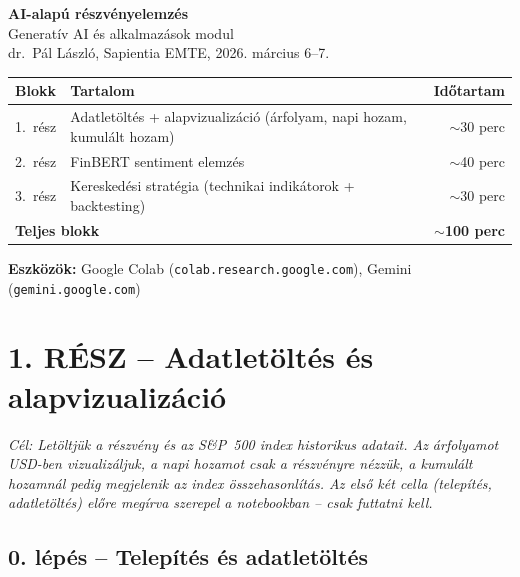 \documentclass[11pt,a4paper]{article}
\begin{document}
\thispagestyle{empty}
\begin{center}
  {\LARGE\bfseries AI-alapú részvényelemzés}\\[5pt]
  {\normalsize Generatív AI és alkalmazások modul}\\[1pt]
  {\small\color{medgray} dr.\ Pál László, Sapientia EMTE, 2026. március 6--7.}
\end{center}

\vspace{10pt}
\noindent
\begin{tabularx}{\linewidth}{lXr}
\toprule
\textbf{Blokk} & \textbf{Tartalom} & \textbf{Időtartam} \\
\midrule
1.\ rész & Adatletöltés + alapvizualizáció (árfolyam, napi hozam, kumulált hozam) & $\sim$30 perc \\
2.\ rész & FinBERT sentiment elemzés & $\sim$40 perc \\
3.\ rész & Kereskedési stratégia (technikai indikátorok + backtesting) & $\sim$30 perc \\
\midrule
\multicolumn{2}{l}{\textbf{Teljes blokk}} & \textbf{$\sim$100 perc} \\
\bottomrule
\end{tabularx}

\smallskip
\noindent\textbf{Eszközök:} Google Colab (\texttt{colab.research.google.com}),
Gemini (\texttt{gemini.google.com})

\vspace{8pt}

\section{1. RÉSZ -- Adatletöltés és alapvizualizáció}

\noindent\textit{Cél: Letöltjük a részvény és az S\&P~500 index historikus adatait.
Az árfolyamot USD-ben vizualizáljuk, a napi hozamot csak a részvényre nézzük,
a kumulált hozamnál pedig megjelenik az index összehasonlítás.
Az első két cella (telepítés, adatletöltés) előre megírva szerepel a notebookban -- csak futtatni kell.}

\bigskip

\subsection{0. lépés -- Telepítés és adatletöltés}
\end{document}
